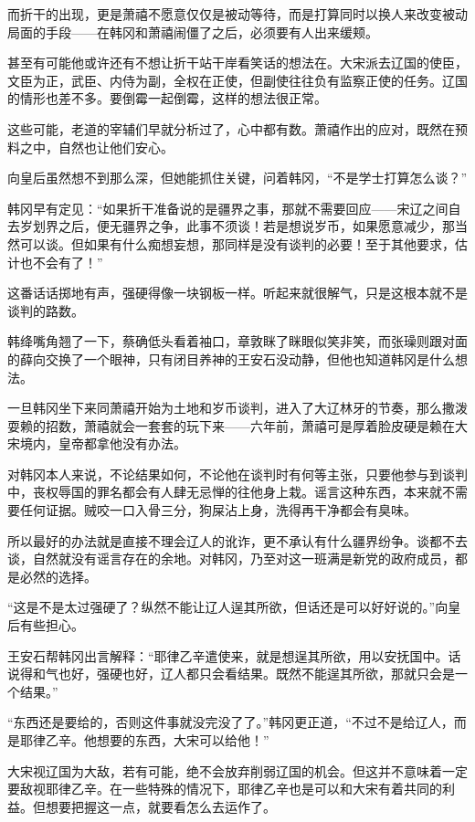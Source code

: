 而折干的出现，更是萧禧不愿意仅仅是被动等待，而是打算同时以换人来改变被动局面的手段——在韩冈和萧禧闹僵了之后，必须要有人出来缓颊。 

甚至有可能他或许还有不想让折干站干岸看笑话的想法在。大宋派去辽国的使臣，文臣为正，武臣、内侍为副，全权在正使，但副使往往负有监察正使的任务。辽国的情形也差不多。要倒霉一起倒霉，这样的想法很正常。 

这些可能，老道的宰辅们早就分析过了，心中都有数。萧禧作出的应对，既然在预料之中，自然也让他们安心。 

向皇后虽然想不到那么深，但她能抓住关键，问着韩冈，“不是学士打算怎么谈？” 

韩冈早有定见：“如果折干准备说的是疆界之事，那就不需要回应——宋辽之间自去岁划界之后，便无疆界之争，此事不须谈！若是想说岁币，如果愿意减少，那当然可以谈。但如果有什么痴想妄想，那同样是没有谈判的必要！至于其他要求，估计也不会有了！” 

这番话话掷地有声，强硬得像一块钢板一样。听起来就很解气，只是这根本就不是谈判的路数。 

韩绛嘴角翘了一下，蔡确低头看着袖口，章敦眯了眯眼似笑非笑，而张璪则跟对面的薛向交换了一个眼神，只有闭目养神的王安石没动静，但他也知道韩冈是什么想法。 

一旦韩冈坐下来同萧禧开始为土地和岁币谈判，进入了大辽林牙的节奏，那么撒泼耍赖的招数，萧禧就会一套套的玩下来——六年前，萧禧可是厚着脸皮硬是赖在大宋境内，皇帝都拿他没有办法。 

对韩冈本人来说，不论结果如何，不论他在谈判时有何等主张，只要他参与到谈判中，丧权辱国的罪名都会有人肆无忌惮的往他身上栽。谣言这种东西，本来就不需要任何证据。贼咬一口入骨三分，狗屎沾上身，洗得再干净都会有臭味。 

所以最好的办法就是直接不理会辽人的讹诈，更不承认有什么疆界纷争。谈都不去谈，自然就没有谣言存在的余地。对韩冈，乃至对这一班满是新党的政府成员，都是必然的选择。 

“这是不是太过强硬了？纵然不能让辽人逞其所欲，但话还是可以好好说的。”向皇后有些担心。 

王安石帮韩冈出言解释：“耶律乙辛遣使来，就是想逞其所欲，用以安抚国中。话说得和气也好，强硬也好，辽人都只会看结果。既然不能逞其所欲，那就只会是一个结果。” 

“东西还是要给的，否则这件事就没完没了了。”韩冈更正道，“不过不是给辽人，而是耶律乙辛。他想要的东西，大宋可以给他！” 

大宋视辽国为大敌，若有可能，绝不会放弃削弱辽国的机会。但这并不意味着一定要敌视耶律乙辛。在一些特殊的情况下，耶律乙辛也是可以和大宋有着共同的利益。但想要把握这一点，就要看怎么去运作了。 


